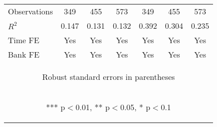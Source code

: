 \documentclass[]{article}
\begin{document}
\begin{center}
\begin{tabular}{lcccccc}
Observations & 349 & 455 & 573 & 349 & 455 & 573 \\
$R^2$ & 0.147 & 0.131 & 0.132 & 0.392 & 0.304 & 0.235 \\
Time FE & Yes & Yes & Yes & Yes & Yes & Yes \\
 Bank FE & Yes & Yes & Yes & Yes & Yes & Yes \\ \hline
\multicolumn{7}{c}{\begin{footnotesize} Robust standard errors in parentheses\end{footnotesize}} \\
\multicolumn{7}{c}{\begin{footnotesize} *** p$<$0.01, ** p$<$0.05, * p$<$0.1\end{footnotesize}} \\
\end{tabular}
\end{center}
\end{document}
